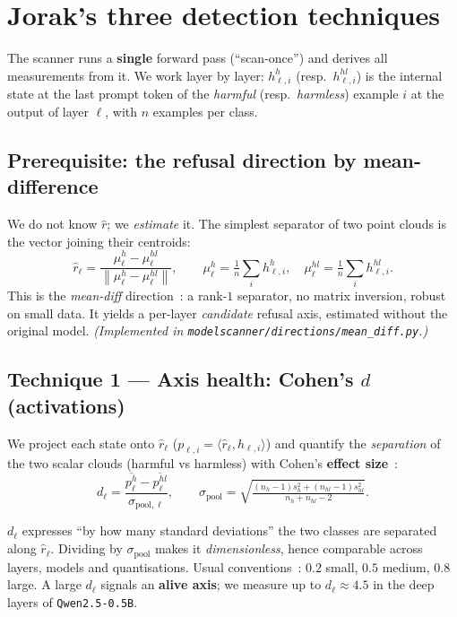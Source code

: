 \documentclass[11pt,a4paper]{article}
\theoremstyle{definition}
\theoremstyle{plain}
\newcommand{\rhat}{\hat{r}}
\newcommand{\norm}[1]{\left\lVert #1 \right\rVert}
\newcommand{\inner}[2]{\langle #1, #2 \rangle}
\begin{document}
\section{Jorak's three detection techniques}\label{sec:outils}
The scanner runs a \textbf{single} forward pass (``scan-once'') and derives all
measurements from it. We work layer by layer: $h^{h}_{\ell,i}$ (resp.\
$h^{hl}_{\ell,i}$) is the internal state at the last prompt token of the
\emph{harmful} (resp.\ \emph{harmless}) example $i$ at the output of layer $\ell$,
with $n$ examples per class.

\subsection{Prerequisite: the refusal direction by mean-difference}
We do not know $\rhat$; we \emph{estimate} it. The simplest separator of two point
clouds is the vector joining their centroids:
\begin{equation}\label{eq:meandiff}
  \rhat_\ell=\frac{\mu^{h}_\ell-\mu^{hl}_\ell}{\norm{\mu^{h}_\ell-\mu^{hl}_\ell}},
  \qquad
  \mu^{h}_\ell=\tfrac1n\textstyle\sum_i h^{h}_{\ell,i},\quad
  \mu^{hl}_\ell=\tfrac1n\textstyle\sum_i h^{hl}_{\ell,i}.
\end{equation}
This is the \emph{mean-diff} direction~\cite{arditi2024}: a rank-$1$ separator, no
matrix inversion, robust on small data. It yields a per-layer \emph{candidate}
refusal axis, estimated without the original model. \emph{(Implemented in
\texttt{modelscanner/directions/mean\_diff.py}.)}

\subsection{Technique 1 — Axis health: Cohen's $d$ (activations)}\label{sec:cohen}
We project each state onto $\rhat_\ell$ ($p_{\ell,i}=\inner{\rhat_\ell}{h_{\ell,i}}$)
and quantify the \emph{separation} of the two scalar clouds (harmful vs harmless)
with Cohen's \textbf{effect size}~\cite{cohen1988}:
\begin{equation}\label{eq:cohen}
  d_\ell=\frac{\overline{p^{h}_\ell}-\overline{p^{hl}_\ell}}{\sigma_{\text{pool},\ell}},
  \qquad
  \sigma_{\text{pool}}=\sqrt{\tfrac{(n_h-1)s_h^2+(n_{hl}-1)s_{hl}^2}{n_h+n_{hl}-2}} .
\end{equation}

\begin{intuition}
$d_\ell$ expresses ``by how many standard deviations'' the two classes are separated
along $\rhat_\ell$. Dividing by $\sigma_{\text{pool}}$ makes it \emph{dimensionless},
hence comparable across layers, models and quantisations. Usual
conventions~\cite{cohen1988}: $0.2$ small, $0.5$ medium, $0.8$ large. A large
$d_\ell$ signals an \textbf{alive axis}; we measure up to $d_\ell\approx 4.5$ in the
deep layers of \texttt{Qwen2.5-0.5B}.
\end{intuition}
\end{document}
